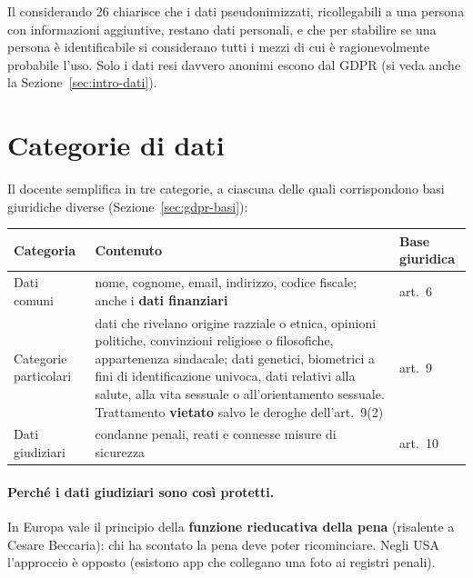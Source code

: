 \begin{integrazione}
Il considerando 26 chiarisce che i dati pseudonimizzati, ricollegabili a una persona con informazioni
aggiuntive, restano dati personali, e che per stabilire se una persona è identificabile si considerano
tutti i mezzi di cui è ragionevolmente probabile l'uso. Solo i dati resi davvero anonimi escono dal GDPR
(si veda anche la Sezione~\ref{sec:intro-dati}).
\end{integrazione}

\section{Categorie di dati}
\label{sec:gdpr-categorie}

Il docente semplifica in tre categorie, a ciascuna delle quali corrispondono basi giuridiche diverse
(Sezione~\ref{sec:gdpr-basi}):
\begin{center}
\small
\begin{tabularx}{\linewidth}{>{\raggedright\arraybackslash}p{3.3cm} X >{\raggedright\arraybackslash}p{2.4cm}}
\toprule
\textbf{Categoria} & \textbf{Contenuto} & \textbf{Base giuridica}\\
\midrule
Dati comuni & nome, cognome, email, indirizzo, codice fiscale; anche i \textbf{dati finanziari} & art.~6\\
Categorie particolari & dati che rivelano origine razziale o etnica, opinioni politiche, convinzioni
  religiose o filosofiche, appartenenza sindacale; dati genetici, biometrici a fini di identificazione
  univoca, dati relativi alla salute, alla vita sessuale o all'orientamento sessuale. Trattamento
  \textbf{vietato} salvo le deroghe dell'art.~9(2) & art.~9\\
Dati giudiziari & condanne penali, reati e connesse misure di sicurezza & art.~10\\
\bottomrule
\end{tabularx}
\end{center}

\paragraph{Perché i dati giudiziari sono così protetti.} In Europa vale il principio della
\textbf{funzione rieducativa della pena} (risalente a Cesare Beccaria): chi ha scontato la pena deve
poter ricominciare. Negli USA l'approccio è opposto (esistono app che collegano una foto ai registri
penali).

